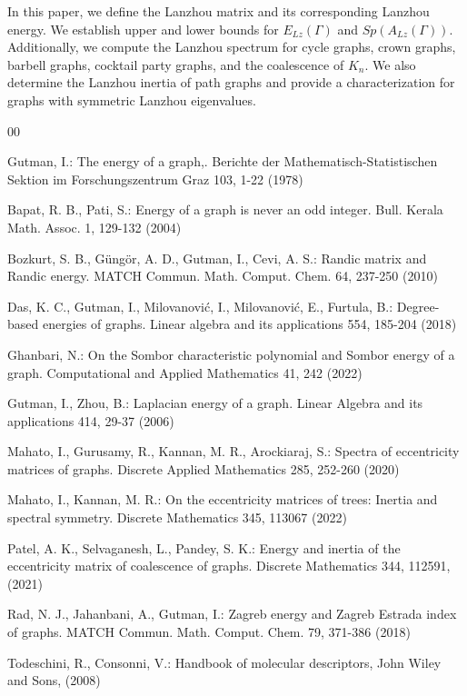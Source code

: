 \documentclass[10pt,a4paper,oneside]{article}
\begin{document}
In this paper, we define the Lanzhou matrix and its corresponding Lanzhou energy. We establish upper and lower bounds for 
$E_{Lz}(\Gamma)$ and $Sp(A_{Lz}(\Gamma)).$ Additionally, we compute the Lanzhou spectrum for cycle graphs, crown graphs, barbell graphs, cocktail party graphs, and the coalescence of $K_n.$ We also determine the Lanzhou inertia of path graphs and provide a characterization for graphs with symmetric Lanzhou eigenvalues.

\begin{thebibliography}{00}

 Gutman, I.: The energy of a graph,. Berichte der Mathematisch-Statistischen Sektion im Forschungszentrum Graz 103, 1-22 (1978)

 Bapat, R. B., Pati, S.: Energy of a graph is never an odd integer. Bull. Kerala Math. Assoc. 1, 129-132 (2004) 

 Bozkurt, S. B., Güngör, A. D., Gutman, I., Cevi, A. S.: Randic matrix and Randic energy. MATCH Commun. Math. Comput. Chem. 64, 237-250 (2010) 

 Das, K. C., Gutman, I., Milovanović, I., Milovanović, E., Furtula, B.: Degree-based energies of graphs. Linear algebra and its applications 554, 185-204 (2018)

 Ghanbari,  N.: On the Sombor characteristic polynomial and Sombor energy of a graph. Computational and Applied Mathematics 41, 242 (2022)

 Gutman, I., Zhou, B.: Laplacian energy of a graph. Linear Algebra and its applications  414, 29-37 (2006)

 Mahato, I., Gurusamy, R., Kannan, M. R., Arockiaraj, S.: Spectra of eccentricity matrices of graphs. Discrete Applied Mathematics 285, 252-260 (2020) 

 Mahato, I., Kannan, M. R.: On the eccentricity matrices of trees: Inertia and spectral symmetry. Discrete Mathematics 345, 113067 (2022)

 Patel, A. K., Selvaganesh, L., Pandey, S. K.: Energy and inertia of the eccentricity matrix of coalescence of graphs. Discrete Mathematics 344, 112591, (2021)

 Rad, N. J., Jahanbani, A., Gutman,  I.: Zagreb energy and Zagreb Estrada index of graphs. MATCH Commun. Math. Comput. Chem. 79, 371-386 (2018)

Todeschini, R., Consonni, V.:  Handbook of molecular descriptors, John Wiley and Sons, (2008)


\end{thebibliography}
\end{document}
